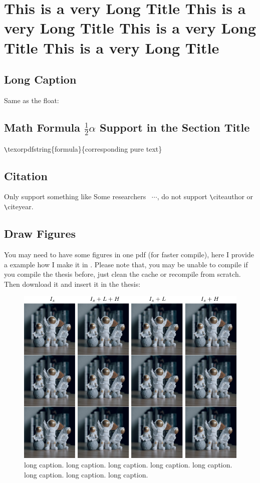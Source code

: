 \chapter[Title in the table of content]{This is a very Long Title This is a very Long Title This is a very Long Title This is a very Long Title}\label{chap:ex}

\section{Long Caption}
Same as the float:


\newpage
\section{Math Formula \texorpdfstring{$\frac{1}{2} \alpha$}{1/2 alpha} Support in the Section Title}\label{math:in:title}
\verb|\|texorpdfstring\{formula\}\{corresponding pure text\}

\section{Citation}
Only support something like Some researchers~\cite{ho2020ddpm} $\cdots$, do not support \verb|\|citeauthor or \verb|\|citeyear.

\section{Draw Figures}
You may need to have some figures in one pdf (for faster compile), here I provide a example how I make it in . Please note that, you may be unable to compile if you compile the thesis before, just clean the cache or recompile from scratch. Then download it and insert it in the thesis:

\begin{figure}[htbp]
    \centering
    \includegraphics[width=0.6\linewidth]{chap-example/figs/example-fig.pdf}
    \caption[a figure]{long caption. long caption. long caption. long caption. long caption. long caption. long caption. long caption.}
    \label{fig:eg}
\end{figure}

